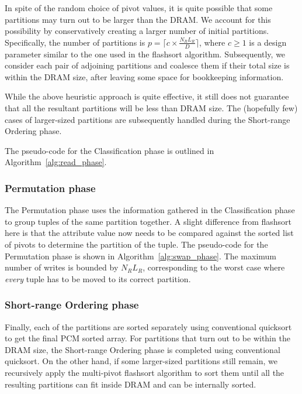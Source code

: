 In spite of the random choice of pivot values, it is quite possible that some
partitions may turn out to be larger than the DRAM. We account for this
possibility by conservatively creating a larger number of initial partitions.
Specifically, the number of partitions is $p = \lceil c \times \frac{N_R
L_R}{D} \rceil$, where $c \geq 1$ is a design parameter similar to the one used
in the flashsort algorithm. Subsequently, we consider each pair of adjoining
partitions and coalesce them if their total size is within the DRAM size, after
leaving some space for bookkeeping information. 

While the above heuristic approach is quite effective, it still does not
guarantee that all the resultant partitions will be less than DRAM size. The
(hopefully few) cases of larger-sized partitions are subsequently handled
during the Short-range Ordering phase.

The pseudo-code for the Classification phase is outlined in
Algorithm~\ref{alg:read_phase}.



\subsubsection{Permutation phase} The Permutation phase uses the information
gathered in the Classification phase to group tuples of the same partition
together. A slight difference from flashsort here is that the attribute value
now needs to be compared against the sorted list of pivots to determine the
partition of the tuple.  The pseudo-code for the Permutation phase is shown in
Algorithm~\ref{alg:swap_phase}.  The maximum number of writes is bounded by
$N_R L_R$, corresponding to the worst case where \emph{every} tuple has to be
moved to its correct partition.



\subsubsection{Short-range Ordering phase} Finally, each of the partitions are
sorted separately using conventional quicksort to get the final PCM sorted
array. For partitions that turn out to be within the DRAM size, the Short-range
Ordering phase is completed using conventional quicksort. On the other hand, if some
larger-sized partitions still remain, we recursively apply the multi-pivot
flashsort algorithm to sort them until all the resulting partitions can fit inside
DRAM and can be internally sorted.

